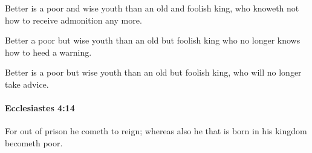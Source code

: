 			\begin{versebox}
					\item[BHS] 
					\item[LXX] 
					\item[ASV] Better is a poor and wise youth than an old and foolish king, who knoweth not how to receive admonition any more.
					\item[NIV] Better a poor but wise youth than an old but foolish king who no longer knows how to heed a warning.
					\item[NRSV] Better is a poor but wise youth than an old but foolish king, who will no longer take advice.
			\end{versebox}

		\paragraph{Ecclesiastes 4:14} %
			\label{ECCLESIASTES-4-14}

			For out of prison he cometh to reign; whereas also he that is born in his kingdom becometh poor.

